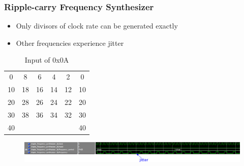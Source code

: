 \documentclass{beamer}
\begin{document}
\begin{frame}
\frametitle{Ripple-carry Frequency Synthesizer}

\begin{itemize}
    \item Only divisors of clock rate can be generated exactly
    \item Other frequencies experience jitter
\end{itemize}

\begin{table}
    \centering
    \caption{Input of 0x0A}
    \begin{tabular}[c]{c | c | c | c | c | c}
        0  & 8  & 6  & 4  & 2  & 0  \\
        10 & 18 & 16 & 14 & 12 & 10 \\
        20 & 28 & 26 & 24 & 22 & 20 \\
        30 & 38 & 36 & 34 & 32 & 30 \\
        40 &    &    &    &    & 40 \\
    \end{tabular}
\end{table}

\begin{figure}[!htb]
    \centering
    \includegraphics[width=\linewidth]{remainder_jitter.PNG}
\end{figure}

\end{frame}
\end{document}
